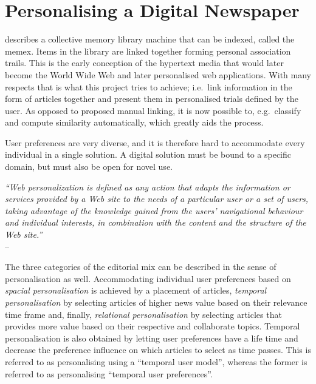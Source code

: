\section{Personalising a Digital Newspaper}
\cite{BushMemex} describes a collective memory library machine that can be indexed, called the memex. Items in the library are linked together forming personal association trails. This is the early conception of the hypertext media that would later become the World Wide Web and later personalised web applications. With many respects that is what this project tries to achieve; i.e.\ link information in the form of articles together and present them in personalised trials defined by the user. As opposed to \cite{BushMemex} proposed manual linking, it is now possible to, e.g.\ classify and compute similarity automatically, which greatly aids the process. 

User preferences are very diverse, and it is therefore hard to accommodate every individual in a single solution. A digital solution must be bound to a specific domain, but must also be open for novel use.

\begin{flushleft}{\slshape
``Web personalization is defined as any action that adapts the information or services provided by a Web site to the needs of a particular user or a set of users, taking advantage of the knowledge gained from the users' navigational behaviour and individual interests, in combination with the content and the structure of the Web site.''} \\ \medskip
-- \cite{MagdaliniWebMining}
\end{flushleft}
	

The three categories of the editorial mix can be described in the sense of personalisation as well. Accommodating individual user preferences based on \emph{spacial personalisation} is achieved by a placement of articles, \emph{temporal personalisation} by selecting articles of higher news value based on their relevance time frame and, finally, \emph{relational personalisation} by selecting articles that provides more value based on their respective and collaborate topics. Temporal personalisation is also obtained by letting user preferences have a life time and decrease the preference influence on which articles to select as time passes. This is referred to as personalising using a ``temporal user model'', whereas the former is referred to as personalising ``temporal user preferences''.

